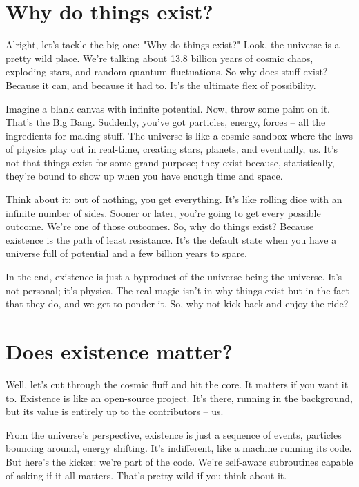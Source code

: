 \documentclass[twocolumn,final]{Axon}
\begin{document}
\section{Why do things exist?}
Alright, let's tackle the big one: "Why do things exist?" Look, the universe is a pretty wild place. We're talking about 13.8 billion years of cosmic chaos, exploding stars, and random quantum fluctuations. So why does stuff exist? Because it can, and because it had to. It's the ultimate flex of possibility. \cite{einstein_bio} \cite{erdos_coffee} \cite{quantumJokes} \cite{quantumTomfoolery2024} \cite{turing_bombe} \cite{MALAJETMAROVA2017209}

Imagine a blank canvas with infinite potential. Now, throw some paint on it. That's the Big Bang. Suddenly, you've got particles, energy, forces – all the ingredients for making stuff. The universe is like a cosmic sandbox where the laws of physics play out in real-time, creating stars, planets, and eventually, us. It’s not that things exist for some grand purpose; they exist because, statistically, they’re bound to show up when you have enough time and space.

Think about it: out of nothing, you get everything. It's like rolling dice with an infinite number of sides. Sooner or later, you're going to get every possible outcome. We’re one of those outcomes. So, why do things exist? Because existence is the path of least resistance. It’s the default state when you have a universe full of potential and a few billion years to spare.

In the end, existence is just a byproduct of the universe being the universe. It’s not personal; it’s physics. The real magic isn't in why things exist but in the fact that they do, and we get to ponder it. So, why not kick back and enjoy the ride?

\section{Does existence matter?}
Well, let's cut through the cosmic fluff and hit the core. It matters if you want it to. Existence is like an open-source project. It’s there, running in the background, but its value is entirely up to the contributors – us.

From the universe's perspective, existence is just a sequence of events, particles bouncing around, energy shifting. It’s indifferent, like a machine running its code. But here’s the kicker: we’re part of the code. We’re self-aware subroutines capable of asking if it all matters. That’s pretty wild if you think about it.
\end{document}
